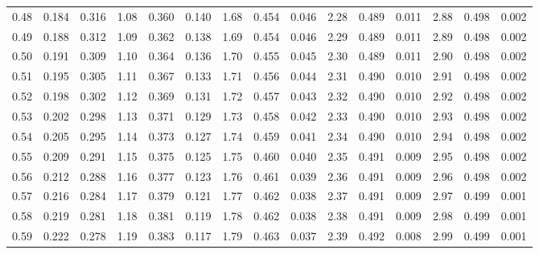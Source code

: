 \documentclass{ltjbook}
\begin{document}
\begin{table}[ht]
{\begin{tabular}[t]{r|rr|r|rr|r|rr|r|rr|r|rr}
			0.48 & 0.184 & 0.316 & 1.08 & 0.360 & 0.140 & 1.68 & 0.454 & 0.046 & 2.28 & 0.489 & 0.011 & 2.88 & 0.498 & 0.002 \\
			0.49 & 0.188 & 0.312 & 1.09 & 0.362 & 0.138 & 1.69 & 0.454 & 0.046 & 2.29 & 0.489 & 0.011 & 2.89 & 0.498 & 0.002 \\
			0.50 & 0.191 & 0.309 & 1.10 & 0.364 & 0.136 & 1.70 & 0.455 & 0.045 & 2.30 & 0.489 & 0.011 & 2.90 & 0.498 & 0.002 \\
			0.51 & 0.195 & 0.305 & 1.11 & 0.367 & 0.133 & 1.71 & 0.456 & 0.044 & 2.31 & 0.490 & 0.010 & 2.91 & 0.498 & 0.002 \\
			0.52 & 0.198 & 0.302 & 1.12 & 0.369 & 0.131 & 1.72 & 0.457 & 0.043 & 2.32 & 0.490 & 0.010 & 2.92 & 0.498 & 0.002 \\
			0.53 & 0.202 & 0.298 & 1.13 & 0.371 & 0.129 & 1.73 & 0.458 & 0.042 & 2.33 & 0.490 & 0.010 & 2.93 & 0.498 & 0.002 \\
			0.54 & 0.205 & 0.295 & 1.14 & 0.373 & 0.127 & 1.74 & 0.459 & 0.041 & 2.34 & 0.490 & 0.010 & 2.94 & 0.498 & 0.002 \\
			0.55 & 0.209 & 0.291 & 1.15 & 0.375 & 0.125 & 1.75 & 0.460 & 0.040 & 2.35 & 0.491 & 0.009 & 2.95 & 0.498 & 0.002 \\
			0.56 & 0.212 & 0.288 & 1.16 & 0.377 & 0.123 & 1.76 & 0.461 & 0.039 & 2.36 & 0.491 & 0.009 & 2.96 & 0.498 & 0.002 \\
			0.57 & 0.216 & 0.284 & 1.17 & 0.379 & 0.121 & 1.77 & 0.462 & 0.038 & 2.37 & 0.491 & 0.009 & 2.97 & 0.499 & 0.001 \\
			0.58 & 0.219 & 0.281 & 1.18 & 0.381 & 0.119 & 1.78 & 0.462 & 0.038 & 2.38 & 0.491 & 0.009 & 2.98 & 0.499 & 0.001 \\
			0.59 & 0.222 & 0.278 & 1.19 & 0.383 & 0.117 & 1.79 & 0.463 & 0.037 & 2.39 & 0.492 & 0.008 & 2.99 & 0.499 & 0.001 \\
			\hline
		\end{tabular}
	}
\end{table}
\end{document}
